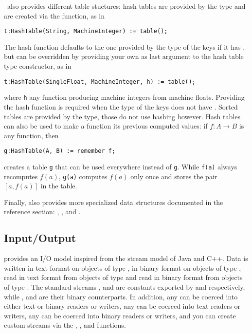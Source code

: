 \libaldor~also provides different table stuctures:
hash tables are provided by the  type and are created
via the  function, as in\\
\centerline{{\tt t:HashTable(String, MachineInteger) := table();}}
The hash function defaults to the one provided by the type of the keys
if it has , but can be overridden by providing your
own as last argument to the hash table type constructor, as in\\
\centerline{{\tt t:HashTable(SingleFloat, MachineInteger, h) := table();}}
where {\tt h} any function producing machine integers from machine
floats. Providing the hash function is required when the type of
the keys does not have . Sorted tables
are provided by the  type,
those do not use hashing however.
Hash tables can also be used to make a function
 its previous
computed values: if $f: A \to B$ is any function, then
\centerline{{\tt g:HashTable(A, B) := remember~f;}}
creates a table {\tt g} that can be used everywhere instead of {\tt g}.
While {\tt f(a)} always recomputes $f(a)$, {\tt g(a)} computes $f(a)$
only once and stores the pair $[a,f(a)]$ in the table.

Finally, \libaldor{} also provides more specialized data structures
documented in the reference section: , ,
 and .

\subsection{Input/Output}
\libaldor{} provides an I/O model inspired from the stream model of
Java and C++.
Data is written in text format on objects of type
, in binary format on objects of type
, read in text format from
objects of type 
and read in binary format from objects of type .
The standard streams ,
 and 
are constants exported
by  and  respectively,
while , 
and  are their binary
counterparts.
In addition, any  can be coerced into either
text or binary readers or writers, any  can
be coerced into text readers or writers, any 
can be coerced into binary readers or writers, and you can create
custom streams via the ,
,
 and 
functions.

